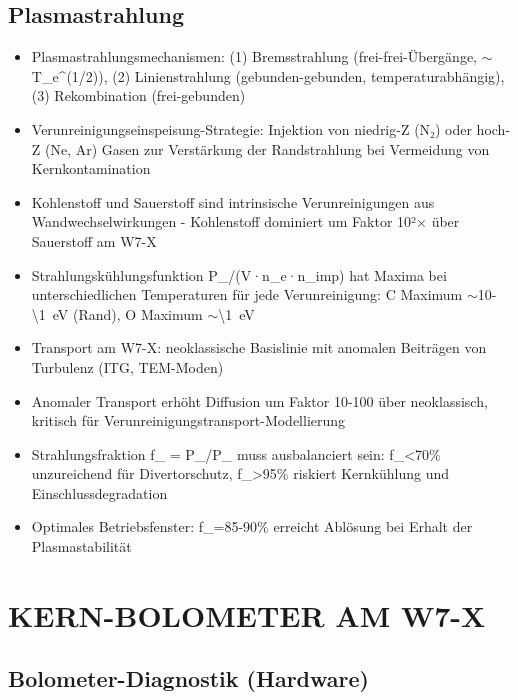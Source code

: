 \documentclass[11pt,a4paper]{article}
\begin{document}
\subsection{Plasmastrahlung}

\begin{itemize}
\item Plasmastrahlungsmechanismen: (1) Bremsstrahlung (frei-frei-Übergänge, $\sim$T_e^(1/2)), (2) Linienstrahlung (gebunden-gebunden, temperaturabhängig), (3) Rekombination (frei-gebunden)
\item Verunreinigungseinspeisung-Strategie: Injektion von niedrig-Z (N₂) oder hoch-Z (Ne, Ar) Gasen zur Verstärkung der Randstrahlung bei Vermeidung von Kernkontamination
\item Kohlenstoff und Sauerstoff sind intrinsische Verunreinigungen aus Wandwechselwirkungen - Kohlenstoff dominiert um Faktor 10²$\times$ über Sauerstoff am W7-X
\item Strahlungskühlungsfunktion P_{}/(V·n_e·n_imp) hat Maxima bei unterschiedlichen Temperaturen für jede Verunreinigung: C Maximum $\sim$10-\SI{\1}{eV} (Rand), O Maximum $\sim$\SI{\1}{eV}
\item Transport am W7-X: neoklassische Basislinie mit anomalen Beiträgen von Turbulenz (ITG, TEM-Moden)
\item Anomaler Transport erhöht Diffusion um Faktor 10-100 über neoklassisch, kritisch für Verunreinigungstransport-Modellierung
\item Strahlungsfraktion f_{} = P_{}/P_{} muss ausbalanciert sein: f_{}<70\% unzureichend für Divertorschutz, f_{}>95\% riskiert Kernkühlung und Einschlussdegradation
\item Optimales Betriebsfenster: f_{}=85-90\% erreicht Ablösung bei Erhalt der Plasmastabilität
\end{itemize}

\section{KERN-BOLOMETER AM W7-X}

\subsection{Bolometer-Diagnostik (Hardware)}
\end{document}
